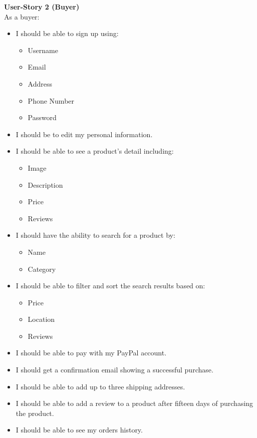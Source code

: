 \documentclass[11pt]{article}
\begin{document}
\textbf{User-Story 2 (Buyer)} \\
As a buyer:
\begin{itemize}
    \item I should be able to sign up using:
        \begin{itemize}
            \item Username
            \item Email
            \item Address
            \item Phone Number
            \item Password
        \end{itemize}
    \item I should be to edit my personal information.
    \item I should be able to see a product's detail including:
        \begin{itemize}
            \item Image
            \item Description
            \item Price
            \item {}Reviews
        \end{itemize}
    \item I should have the ability to search for a product by:
        \begin{itemize}
            \item Name
            \item Category
        \end{itemize}
    \item I should be able to filter and sort the search results based on:
        \begin{itemize}
            \item Price
            \item Location
            \item {}Reviews
        \end{itemize}
    \item I should be able to pay with my PayPal account.
    \item I should get a confirmation email showing a successful purchase.
    \item I should be able to add up to three shipping addresses.
    \item I should be able to add a review to a product after fifteen days of purchasing the product.
    \item I should be able to see my orders history.

\end{itemize}
\end{document}
